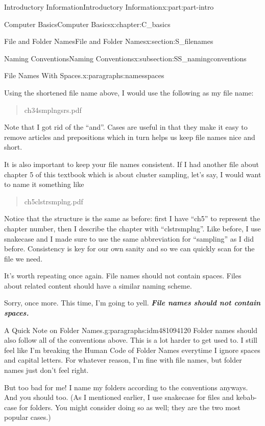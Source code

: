 \documentclass[oneside,10pt,]{book}
\newcommand{\alert}[1]{\textbf{\textit{#1}}}
\begin{document}
\begin{partptx}{Introductory Information}{}{Introductory Information}{}{}{x:part:part-intro}
\begin{chapterptx}{Computer Basics}{}{Computer Basics}{}{}{x:chapter:C_basics}
\begin{sectionptx}{File and Folder Names}{}{File and Folder Names}{}{}{x:section:S_filenames}
\begin{subsectionptx}{Naming Conventions}{}{Naming Conventions}{}{}{x:subsection:SS_namingconventions}
\begin{paragraphs}{File Names With Spaces.}{x:paragraphs:namesspaces}
\par
Using the shortened file name above, I would use the following as my file name: \begin{quote}%
ch3\textunderscore{}4\textunderscore{}smplng\textunderscore{}srs.pdf\end{quote}
 Note that I got rid of the ``and''. Cases are useful in that they make it easy to remove articles and prepositions which in turn helps us keep file names nice and short.%
\par
It is also important to keep your file names consistent. If I had another file about chapter 5 of this textbook which is about cluster sampling, let's say, I would want to name it something like \begin{quote}%
ch5\textunderscore{}clstr\textunderscore{}smplng.pdf\end{quote}
 Notice that the structure is the same as before: first I have ``ch5'' to represent the chapter number, then I describe the chapter with ``clstr\textunderscore{}smplng''. Like before, I use snake\textunderscore{}case and I made sure to use the same abbreviation for ``sampling'' as I did before. Consistency is key for our own sanity and so we can quickly scan for the file we need.%
\par
It's worth repeating once again. File names should not contain spaces. Files about related content should have a similar naming scheme.%
\par
Sorry, once more. This time, I'm going to yell. \alert{File names should not contain spaces.}%
\end{paragraphs}%
\begin{paragraphs}{A Quick Note on Folder Names.}{g:paragraphs:idm481094120}%
%
%
Folder names should also follow all of the conventions above. This is a lot harder to get used to. I still feel like I'm breaking the Human Code of Folder Names everytime I ignore spaces and capital letters. For whatever reason, I'm fine with file names, but folder names just don't feel right.%
\par
But too bad for me! I name my folders according to the conventions anyways. And you should too. (As I mentioned earlier, I use snake\textunderscore{}case for files and kebab-case for folders. You might consider doing so as well; they are the two most popular cases.)%
\end{paragraphs}%
\end{subsectionptx}
%
%
\typeout{************************************************}

\end{sectionptx}
\end{chapterptx}
\end{partptx}
\end{document}

